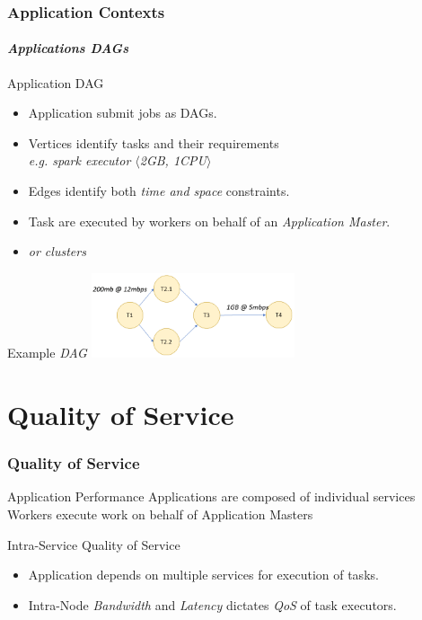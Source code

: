 \documentclass{beamer}
\begin{document}
\begin{frame}
	\frametitle{Application Contexts}
	\framesubtitle{\textit{Applications DAGs}}
\begin{block}{Application DAG}
		\begin{itemize}
			\item Application submit jobs as DAGs.
			\item Vertices identify tasks and their requirements \\ \textit{e.g. spark executor $\langle$2GB, 1CPU$\rangle$}
			\item Edges identify both \textit{time and space} constraints.
			\item Task are executed by workers on behalf of an \textit{Application Master}.
			\item \textit{or clusters}
		\end{itemize}
\end{block}
\begin{exampleblock}{Example \textit{DAG}}
		\includegraphics[height=2.5cm]{img/task-dag.png}
	\end{exampleblock}
\end{frame}


\section{Quality of Service}
	\begin{frame}		
	 	\frametitle{Quality of Service}
		\begin{block}{Application Performance}
			Applications are composed of individual services\\
			Workers execute work on behalf of Application Masters\\
		\end{block}
		\begin{alertblock}{Intra-Service Quality of Service}
			\begin{itemize}
				\item Application depends on multiple services for execution of tasks.
				\item Intra-Node \textit{Bandwidth} and \textit{Latency} dictates \textit{QoS} of task executors.
			\end{itemize}
		\end{alertblock}
	\end{frame}
\end{document}

